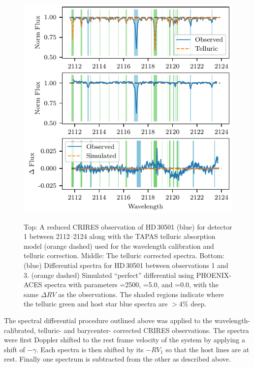 \begin{figure}
    \centering
    \includegraphics[width=0.8\hsize]{figures/direct-recovery/differential.pdf}\\
    \caption[Example of the spectral differential technique.]{Top: A reduced {CRIRES} observation of {HD\,30501} (blue) for detector 1 between 2112--2124\nm{} along with the {TAPAS} telluric absorption model ({orange} dashed) used for the wavelength calibration and telluric correction.
    Middle: The telluric corrected spectra.
    Bottom: ({blue}) Differential spectra for {HD\,30501} between observations 1 and 3.
    ({orange} dashed) Simulated ``perfect'' differential using {PHOENIX-ACES} spectra with parameters \Teff{}=2500\K{}, \Logg{}=5.0, and \feh{}=0.0, with the same \(\Delta {RV}\) as the observations.
    The shaded regions indicate where the telluric {green} and host star {blue} spectra are \(> 4\%\) deep.}
    \label{fig:spectral_example}
\end{figure}


The spectral differential procedure outlined above was applied to the wavelength-calibrated, telluric- and barycenter- corrected {CRIRES} observations.
The spectra were first Doppler shifted to the rest frame velocity of the system by applying a shift of \(-\gamma\).
Each spectra is then shifted by its $-{RV}_{1}$ so that the host lines are at rest.
Finally one spectrum is subtracted from the other as described above.

